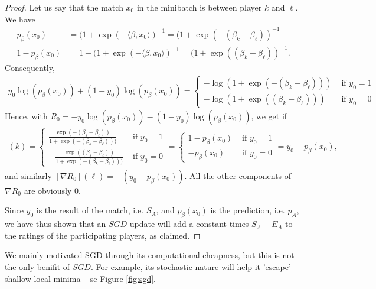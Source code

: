 \documentclass{article}
\newcommand{\sprod}[1]{\langle #1 \rangle}
\begin{document}
\begin{proof}
    Let us say that the match $x_0$ in the minibatch is between player $k$ and $\ell$. We have
    \begin{align*}
        p_\beta(x_0) &= (1+\exp(-\sprod{\beta,x_0})^{-1} = (1+\exp(-(\beta_k-\beta_\ell))^{-1} \\
        1-p_\beta(x_0) &= 1- (1+\exp(-\sprod{\beta,x_0})^{-1} = (1+\exp((\beta_k-\beta_\ell))^{-1}.
    \end{align*}
    Consequently,
    \begin{align*}
        y_0 \log(p_\beta(x_0)) + (1-y_0) \log(p_\beta(x_0)) =\begin{cases}
            - \log(1+\exp(-(\beta_k-\beta_\ell)))  &\text{ if $y_0=1$} \\
            -\log(1+\exp((\beta_k-\beta_\ell)))  &\text{ if $y_0=0$}
        \end{cases} 
    \end{align*}
    Hence, with $R_0 = - y_0 \log(p_\beta(x_0)) - (1-y_0) \log(p_\beta(x_0))$, we get if
    \begin{align*}
        [\nabla R_0](k) = \begin{cases}
            \frac{\exp(-(\beta_k-\beta_\ell))}{ 1+\exp(-(\beta_k-\beta_\ell)))}  &\text{ if $y_0=1$} \\
            -\frac{\exp((\beta_k-\beta_\ell))}{ 1+\exp(-(\beta_k-\beta_\ell)))}  &\text{ if $y_0=0$}
            \end{cases} = \begin{cases}
                1-p_\beta(x_0)  &\text{ if $y_0=1$} \\
            - p_\beta(x_0) &\text{ if $y_0=0$}
            \end{cases} = y_0 - p_\beta(x_0),
    \end{align*}
    and similarly  $[\nabla R_0](\ell) = -(y_0 - p_\beta(x_0))$. All the other components of $\nabla R_0$ are obviously $0$. 
    
    Since $y_0$ is the result of the match, i.e. $S_A$, and $p_\beta(x_0)$ is the prediction, i.e. $p_A$, we have thus shown that an $SGD$ update will add a constant times $S_A-E_A$ to the ratings of the participating players, as claimed.
\end{proof}




We mainly motivated SGD through its computational cheapness, but this is not the only benifit of $SGD$. For example, its stochastic nature will help it 'escape' shallow local minima -- se Figure \ref{fig:sgd}.
\end{document}
